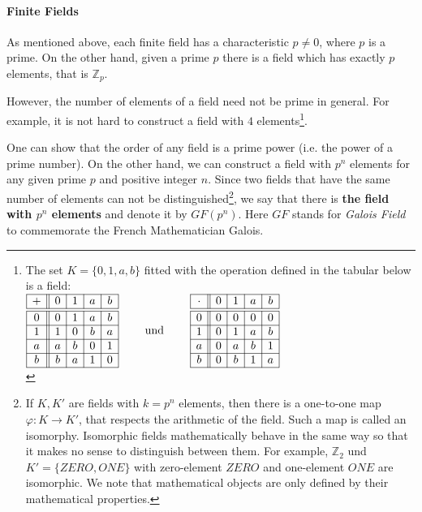 \paragraph{Finite Fields}
As mentioned above, each finite field has a characteristic $p\ne 0$, where $p$ is a prime. On the other hand, given a prime $p$ there is a field which has exactly $p$ elements, that is ${\mathbb Z}_p$.

However, the number of elements of a field need not be prime in general. For example, it is not hard to construct a field with $4$ elements\footnote{%
The set $K=\{0,1,a,b\}$ fitted with the operation defined in the tabular below is a field:\\
$
\begin{array}{|c||c|c|c|c|} 
\hline 
+ & 0 & 1 & a & b \\
\hline \hline
0 & 0 & 1 & a & b \\
\hline 
1 & 1 & 0 & b & a \\
\hline 
a & a & b & 0 & 1 \\
\hline 
b & b & a & 1 & 0 \\
\hline 
\end{array} \qquad {\rm ~und~} \qquad
\begin{array}{|c||c|c|c|c|} 
\hline 
\cdot & 0 & 1 & a & b  \\
\hline \hline
0 & 0 & 0 & 0 & 0 \\ 
\hline 
1 & 0 & 1 & a & b \\ 
\hline 
a & 0 & a & b & 1 \\ 
\hline 
b & 0 & b & 1 & a \\
\hline 
\end{array} 
$  \\
}.

One can show that the order of any field is a prime power (i.e. the power of a prime number). On the other hand, we can construct a field with $p^n$ elements for any given prime $p$ and positive integer $n$. Since two fields that have the same number of elements can not be distinguished\footnote{If $K,K'$ are fields with $k=p^n$ elements, then there is a one-to-one map $\varphi:K\to K'$, that respects the arithmetic of the field. Such a map is called an isomorphy. Isomorphic fields mathematically behave in the same way so that   it makes no sense to distinguish between them. For example, ${\mathbb Z}_2$ und $K'=\{ ZERO,ONE\}$ with zero-element $ZERO$ and one-element $ONE$ are isomorphic. We note that mathematical objects are only defined by their mathematical properties.}, we say that there is {\bf the field with $p^n$ elements} and denote it by $GF(p^n)$. Here $GF$ stands for {\it Galois Field} to commemorate the French Mathematician Galois.

